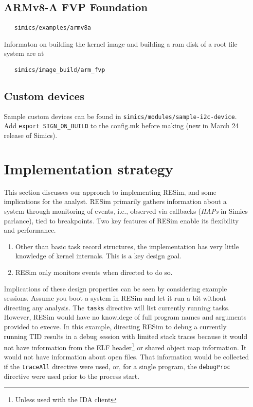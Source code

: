\documentclass[titlepage]{article}
\begin{document}
\subsection{ARMv8-A FVP Foundation}
\begin{verbatim}
   simics/examples/armv8a
\end{verbatim}
Informaton on building the kernel image and building a ram disk of a root file system are at
\begin{verbatim}
   simics/image_build/arm_fvp
\end{verbatim}

\subsection{Custom devices}
Sample custom devices can be found in {\tt simics/modules/sample-i2c-device}.
Add {\tt export SIGN\_ON\_BUILD} to the config.mk before making (new in March 24 release of Simics).


\section{Implementation strategy}
\label{implementation}
This section discusses our approach to implementing RESim, and some implications for the analyst.
RESim primarily gathers information about a system through monitoring of events, i.e., observed via callbacks (\textit{HAPs} in Simics parlance), tied to 
breakpoints.  Two key features of RESim enable its flexibility and performance.  

\begin{enumerate}
\item Other than basic task record structures, the implementation has very little knowledge of kernel internals.
This is a key design goal.  
\item RESim only monitors events when directed to do so.
\end{enumerate}
\noindent Implications of these design properties can be seen by considering example sessions.  Assume you boot a system in RESim and let it run a bit without
directing any analysis.  The {\tt tasks} directive will list currently running tasks.  However, RESim would have no knowldege of full program names and arguments
provided to execve.  In this example, directing RESim to debug a currently running TID results in a debug session with limited stack traces because
it would not have information from the ELF header\footnote{Unless used with the IDA client}  or shared object map information.  It would not have
information about open files.
That information would be collected if the {\tt traceAll} directive were used, or, for a single program, the {\tt debugProc} directive were used prior to the
process start.
\end{document}
